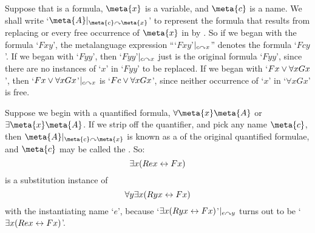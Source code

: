 Suppose that  is a formula, $\meta{x}$ is a variable, and $\meta{c}$ is a name. We shall write `$\meta{A}\subs{\meta{c}}{\meta{x}}$' to represent the formula that results from replacing or  every free occurrence of $\meta{x}$ in  by . So if we began with the formula `$Fxy$', the metalanguage expression ``{`$Fxy$'}$\vert_{c\curvearrowright x}$'' denotes the formula `$Fcy$'. If we began with `$Fyy$', then `$Fyy$'$\vert_{c\curvearrowright x}$ just is the original formula `$Fyy$', since there are no instances of `$x$' in `$Fyy$' to be replaced. If we began with `$Fx \vee \forall x Gx$', then `$Fx \vee \forall x Gx$'$\vert_{c\curvearrowright x}$ is `$Fc \vee \forall x Gx$', since neither occurrence of `$x$' in `$\forall x Gx$' is free.

Suppose we begin with a quantified formula, $\forall \meta{x}\meta{A}$ or $\exists \meta{x}\meta{A}$. If we strip off the quantifier, and pick any name $\meta{c}$, then $\meta{A}\subs{\meta{c}}{\meta{x}}$ is known as a   of the original quantified formulae, and $\meta{c}$ may be called the . So:
	$$\exists x (Rex \leftrightarrow Fx)$$
is a substitution instance of 
	$$\forall y \exists x (Ryx \leftrightarrow Fx)$$
with the instantiating name `$e$', because  `$\exists x (Ryx \leftrightarrow Fx)$'$\vert_{e\curvearrowright y}$ turns out to be `$\exists x (Rex \leftrightarrow Fx)$'.

